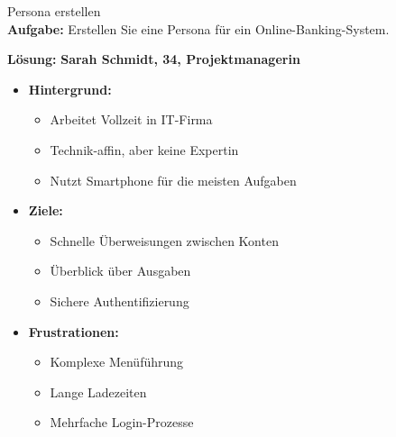 \begin{example2}{Persona erstellen}\\
\textbf{Aufgabe:} Erstellen Sie eine Persona für ein Online-Banking-System.

\textbf{Lösung:} 
\textbf{Sarah Schmidt, 34, Projektmanagerin}
\begin{itemize}
    \item \textbf{Hintergrund:}
    \begin{itemize}
        \item Arbeitet Vollzeit in IT-Firma
        \item Technik-affin, aber keine Expertin
        \item Nutzt Smartphone für die meisten Aufgaben
    \end{itemize}
    \item \textbf{Ziele:}
    \begin{itemize}
        \item Schnelle Überweisungen zwischen Konten
        \item Überblick über Ausgaben
        \item Sichere Authentifizierung
    \end{itemize}
    \item \textbf{Frustrationen:}
    \begin{itemize}
        \item Komplexe Menüführung
        \item Lange Ladezeiten
        \item Mehrfache Login-Prozesse
    \end{itemize}
\end{itemize}
\end{example2}

